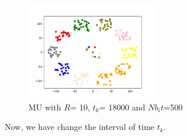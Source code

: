 \documentclass{article}
\begin{document}
\begin{figure}[h]
    \centering
    \includegraphics[width=0.5\textwidth]{images/MU500_R10_t18000.png}
    \caption{MU with $R$= 10, $t_{k}$= 18000 and $Nb_it$=500}

\end{figure}

Now, we have change the interval of time $t_{k}$.\\


    
\end{document}
